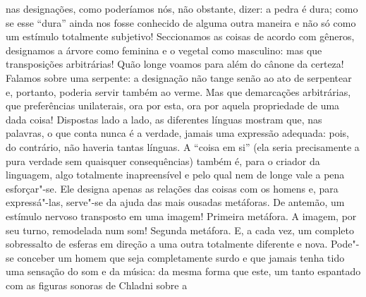 nas designações, como poderíamos nós, não obstante, dizer: a pedra é
dura; como se esse “dura” ainda nos fosse conhecido de alguma outra
maneira e não só como um estímulo totalmente subjetivo! Seccionamos as
coisas de acordo com gêneros, designamos a árvore como feminina e o
vegetal como masculino: mas que transposições arbitrárias! Quão longe
voamos para além do cânone da certeza! Falamos sobre uma serpente: a
designação não tange senão ao ato de serpentear e, portanto, poderia
servir também ao verme. Mas que demarcações arbitrárias, que
preferências unilaterais, ora por esta, ora por aquela propriedade de
uma dada coisa! Dispostas lado a lado, as diferentes línguas mostram
que, nas palavras, o que conta nunca é a verdade, jamais uma expressão
adequada: pois, do contrário, não haveria tantas línguas. A “coisa em
si” (ela seria precisamente a pura verdade sem quaisquer consequências)
também é, para o criador da linguagem, algo totalmente inapreensível e
pelo qual nem de longe vale a pena esforçar"-se. Ele designa apenas as
relações das coisas com os homens e, para expressá"-las, serve"-se da
ajuda das mais ousadas metáforas. De antemão, um estímulo nervoso
transposto em uma imagem! Primeira metáfora. A imagem, por seu turno,
remodelada num som! Segunda metáfora. E, a cada vez, um completo
sobressalto de esferas em direção a uma outra totalmente diferente e
nova. Pode"-se conceber um homem que seja completamente surdo e que
jamais tenha tido uma sensação do som e da música: da mesma forma que
este, um tanto espantado com as figuras sonoras de Chladni sobre a
